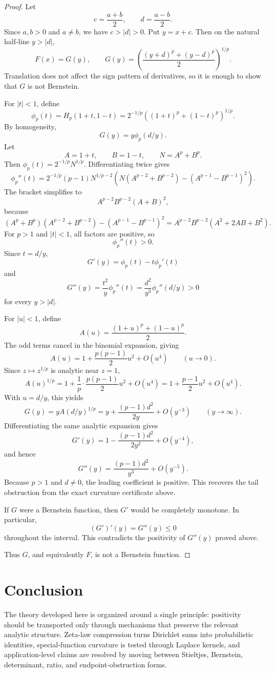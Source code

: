 \documentclass[11pt]{article}
\numberwithin{equation}{section}
\theoremstyle{definition}
\theoremstyle{remark}
\newcommand{\1}{\mathbf 1}
\begin{document}
\begin{proof}
Let
\[
c=\frac{a+b}{2},\qquad d=\frac{a-b}{2}.
\]
Since \(a,b>0\) and \(a\ne b\), we have \(c>|d|>0\). Put \(y=x+c\). Then on the natural half-line \(y>|d|\),
\[
F(x)=G(y),
\qquad
G(y)=\left(\frac{(y+d)^p+(y-d)^p}{2}\right)^{1/p}.
\]
Translation does not affect the sign pattern of derivatives, so it is enough to show that \(G\) is not Bernstein.

For \(|t|<1\), define
\[
\phi_p(t)=H_p(1+t,1-t)
=2^{-1/p}\left((1+t)^p+(1-t)^p\right)^{1/p}.
\]
By homogeneity,
\[
G(y)=y\phi_p(d/y).
\]
Let
\[
A=1+t,\qquad B=1-t,\qquad N=A^p+B^p.
\]
Then \(\phi_p(t)=2^{-1/p}N^{1/p}\). Differentiating twice gives
\[
\phi_p''(t)
=2^{-1/p}(p-1)N^{1/p-2}
\left(N(A^{p-2}+B^{p-2})-(A^{p-1}-B^{p-1})^2\right).
\]
The bracket simplifies to
\[
A^{p-2}B^{p-2}(A+B)^2,
\]
because
\[
(A^p+B^p)(A^{p-2}+B^{p-2})-(A^{p-1}-B^{p-1})^2
=A^{p-2}B^{p-2}(A^2+2AB+B^2).
\]
For \(p>1\) and \(|t|<1\), all factors are positive, so
\[
\phi_p''(t)>0.
\]
Since \(t=d/y\),
\[
G'(y)=\phi_p(t)-t\phi_p'(t)
\]
and
\[
G''(y)=\frac{t^2}{y}\phi_p''(t)
=\frac{d^2}{y^3}\phi_p''(d/y)>0
\]
for every \(y>|d|\).

For \(|u|<1\), define
\[
A(u)=\frac{(1+u)^p+(1-u)^p}{2}.
\]
The odd terms cancel in the binomial expansion, giving
\[
A(u)=1+\frac{p(p-1)}{2}u^2+O(u^4)
\qquad (u\to0).
\]
Since \(z\mapsto z^{1/p}\) is analytic near \(z=1\),
\[
A(u)^{1/p}
=1+\frac1p\cdot\frac{p(p-1)}{2}u^2+O(u^4)
=1+\frac{p-1}{2}u^2+O(u^4).
\]
With \(u=d/y\), this yields
\[
G(y)
=yA(d/y)^{1/p}
=y+\frac{(p-1)d^2}{2y}+O(y^{-3})
\qquad (y\to\infty).
\]
Differentiating the same analytic expansion gives
\[
G'(y)
=1-\frac{(p-1)d^2}{2y^2}+O(y^{-4}),
\]
and hence
\[
G''(y)
=\frac{(p-1)d^2}{y^3}+O(y^{-5}).
\]
Because \(p>1\) and \(d\ne0\), the leading coefficient is positive. This recovers the tail obstruction from the exact curvature certificate above.

If \(G\) were a Bernstein function, then \(G'\) would be completely monotone. In particular,
\[
(G')'(y)=G''(y)\le0
\]
throughout the interval. This contradicts the positivity of \(G''(y)\) proved above.

Thus \(G\), and equivalently \(F\), is not a Bernstein function.
\end{proof}

\section{Conclusion}

The theory developed here is organized around a single principle: positivity
should be transported only through mechanisms that preserve the relevant
analytic structure.  Zeta-law compression turns Dirichlet sums into
probabilistic identities, special-function curvature is tested through
Laplace kernels, and application-level claims are resolved by moving between
Stieltjes, Bernstein, determinant, ratio, and endpoint-obstruction forms.
\end{document}
